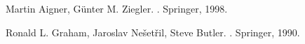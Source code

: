 \documentclass{article}
\theoremstyle{definition}
\begin{document}
		\newpage

	\begin{thebibliography}{99}
		Martin Aigner, Günter M. Ziegler.
		.
		\newblock Springer, 1998.

		Ronald L. Graham, Jaroslav Nešetřil, Steve Butler.
		.
		\newblock Springer, 1990.

	\end{thebibliography}	

	
\end{document}
